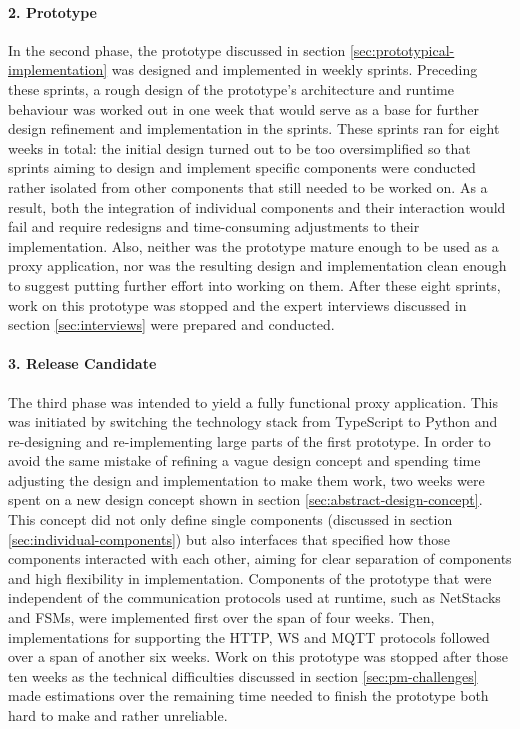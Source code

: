 \paragraph{2. Prototype} In the second phase, the prototype discussed in section \ref{sec:prototypical-implementation} was designed and implemented in weekly sprints. Preceding these sprints, a rough design of the prototype's architecture and runtime behaviour was worked out in one week that would serve as a base for further design refinement and implementation in the sprints. These sprints ran for eight weeks in total: the initial design turned out to be too oversimplified so that sprints aiming to design and implement specific components were conducted rather isolated from other components that still needed to be worked on. As a result, both the integration of individual components and their interaction would fail and require redesigns and time-consuming adjustments to their implementation. Also, neither was the prototype mature enough to be used as a proxy application, nor was the resulting design and implementation clean enough to suggest putting further effort into working on them. After these eight sprints, work on this prototype was stopped and the expert interviews discussed in section \ref{sec:interviews} were prepared and conducted.
\paragraph{3. Release Candidate} The third phase was intended to yield a fully functional proxy application. This was initiated by switching the technology stack from TypeScript to Python and re-designing and re-implementing large parts of the first prototype. In order to avoid the same mistake of refining a vague design concept and spending time adjusting the design and implementation to make them work, two weeks were spent on a new design concept shown in section \ref{sec:abstract-design-concept}. This concept did not only define single components (discussed in section \ref{sec:individual-components}) but also interfaces that specified how those components interacted with each other, aiming for clear separation of components and high flexibility in implementation. Components of the prototype that were independent of the communication protocols used at runtime, such as NetStacks and \acp{FSM}, were implemented first over the span of four weeks. Then, implementations for supporting the \ac{HTTP}, \ac{WS} and \ac{MQTT} protocols followed over a span of another six weeks. Work on this prototype was stopped after those ten weeks as the technical difficulties discussed in section \ref{sec:pm-challenges} made estimations over the remaining time needed to finish the prototype both hard to make and rather unreliable.
